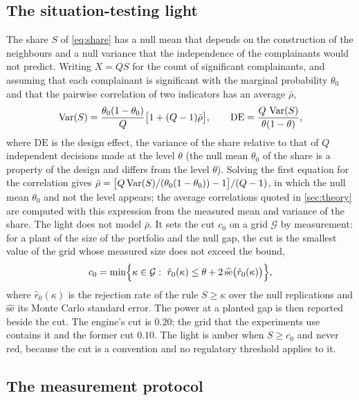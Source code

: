 \subsection{The situation-testing light}

The share $S$ of \cref{eq:share} has a null mean that depends on the construction of the neighbours and a null variance that the independence of the complainants would not predict. Writing $X=QS$ for the count of significant complainants, and assuming that each complainant is significant with the marginal probability $\theta_0$ and that the pairwise correlation of two indicators has an average $\bar\rho$,
\begin{equation}
\operatorname{Var}(S)=\frac{\theta_0(1-\theta_0)}{Q}\bigl[1+(Q-1)\bar\rho\bigr],\qquad \mathrm{DE}=\frac{Q\,\operatorname{Var}(S)}{\theta(1-\theta)},
\label{eq:design-effect}
\end{equation}
where $\mathrm{DE}$ is the design effect, the variance of the share relative to that of $Q$ independent decisions made at the level $\theta$ (the null mean $\theta_0$ of the share is a property of the design and differs from the level $\theta$). Solving the first equation for the correlation gives $\bar\rho=\bigl[Q\operatorname{Var}(S)/(\theta_0(1-\theta_0))-1\bigr]/(Q-1)$, in which the null mean $\theta_0$ and not the level appears; the average correlations quoted in \cref{sec:theory} are computed with this expression from the measured mean and variance of the share. The light does not model $\bar\rho$. It sets the cut $c_0$ on a grid $\mathcal{G}$ by measurement: for a plant of the size of the portfolio and the null gap, the cut is the smallest value of the grid whose measured size does not exceed the bound,
\begin{equation}
c_0=\min\Bigl\{\kappa\in\mathcal{G}:\ \hat r_0(\kappa)\le\theta+2\,\widehat{\mathrm{se}}\bigl(\hat r_0(\kappa)\bigr)\Bigr\},
\label{eq:cut-rule}
\end{equation}
where $\hat r_0(\kappa)$ is the rejection rate of the rule $S\ge\kappa$ over the null replications and $\widehat{\mathrm{se}}$ its Monte Carlo standard error. The power at a planted gap is then reported beside the cut. The engine's cut is $0.20$; the grid that the experiments use contains it and the former cut $0.10$. The light is amber when $S\ge c_0$ and never red, because the cut is a convention and no regulatory threshold applies to it.

\subsection{The measurement protocol}


